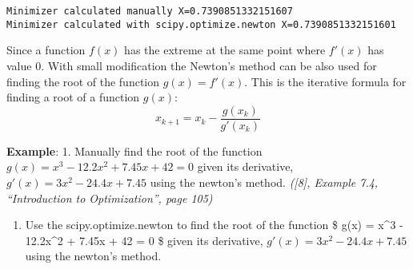 \documentclass[11pt]{article}
\providecommand{\tightlist}{%
      \setlength{\itemsep}{0pt}\setlength{\parskip}{0pt}}
\begin{document}
    \begin{Verbatim}[commandchars=\\\{\}]
Minimizer calculated manually X=0.7390851332151607
Minimizer calculated with scipy.optimize.newton X=0.7390851332151601
    \end{Verbatim}

    Since a function \(f(x)\) has the extreme at the same point where
\(f'(x)\) has value 0. With small modification the Newton's method can
be also used for finding the root of the function \(g(x)=f'(x)\). This
is the iterative formula for finding a root of a function \(g(x)\): \[
x_{k+1} = x_k - \frac{g(x_k)}{g'(x_k)}
\]

\newpage

\textbf{Example}: 1. Manually find the root of the function
\(g(x) = x^3 - 12.2x^2 + 7.45x + 42 = 0\) given its derivative,
\(g'(x) = 3x^2 - 24.4x + 7.45\) using the newton's method.
\emph{({[}8{]}, Example 7.4, ``Introduction to Optimization'', page
105)}

\begin{enumerate}
\def\labelenumi{\arabic{enumi}.}
\setcounter{enumi}{1}
\tightlist
\item
  Use the scipy.optimize.newton to find the root of the function \$ g(x)
  = x\^{}3 - 12.2x\^{}2 + 7.45x + 42 = 0 \$ given its derivative,
  \(g'(x) = 3x^2 - 24.4x + 7.45\) using the newton's method.
\end{enumerate}
\end{document}
